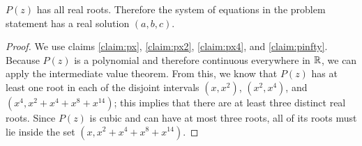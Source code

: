 \documentclass[10pt]{../usamts}
\begin{document}
\begin{solution}
\begin{claim}
    $P(z)$ has all real roots. Therefore the system of equations in the problem statement has a real solution $(a,b,c)$.
\end{claim}

\begin{proof}
    We use claims \ref{claim:px}, \ref{claim:px2}, \ref{claim:px4}, and \ref{claim:pinfty}.
    Because $P(z)$ is a polynomial and therefore continuous everywhere in $\mathbb{R}$, we can apply the intermediate value theorem.
    From this, we know that $P(z)$ has at least one root in each of the disjoint intervals $(x, x^2)$, $(x^2, x^4)$, and $(x^4, x^2 + x^4 + x^8 + x^{14})$; this implies that there are at least three distinct real roots. Since $P(z)$ is cubic and can have at most three roots, all of its roots must lie inside the set $(x,x^2 + x^4 + x^8 + x^{14})$.
\end{proof}

\end{solution}
\end{document}
